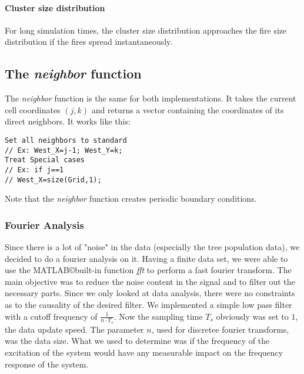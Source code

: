 \documentclass[11pt]{article}
\begin{document}
\paragraph*{Cluster size distribution}
For long simulation times, the cluster size distribution approaches the fire size distribution if the fires spread instantaneously. 

\subsection{The \emph{neighbor} function}
The \emph{neighbor} function is the same for both implementations. It takes the current cell coordinates  $(j,k)$ and returns a vector containing the coordinates of its direct neighbors. It works like this:
\begin{verbatim}
Set all neighbors to standard
// Ex: West_X=j-1; West_Y=k;
Treat Special cases
// Ex: if j==1
// West_X=size(Grid,1);
\end{verbatim}
Note that the \emph{neighbor} function creates periodic boundary conditions. 

\subsubsection{Fourier Analysis}
Since there is a lot of "noise" in the data (especially the tree population data), we decided to do a fourier analysis on it. Having a finite data set, we were able to use the MATLAB\copyright built-in function \emph{fft} to perform a fast fourier transform. The main objective was to reduce the noise content in the signal and to filter out the necessary parts. Since we only looked at data analysis, there were no constraints as to the causality of the desired filter. We implemented a simple low pass filter with a cutoff frequency of $\frac {1}{n\cdot T_{s}}$.  Now the sampling time $T_{s}$ obviously was set to $1$, the data update speed. The parameter $n$, used for discretee fourier transforms, was the data size. 
What we used to determine was if the frequency of the excitation of the system would have any measurable impact on the frequency response of the system. 
\end{document}
